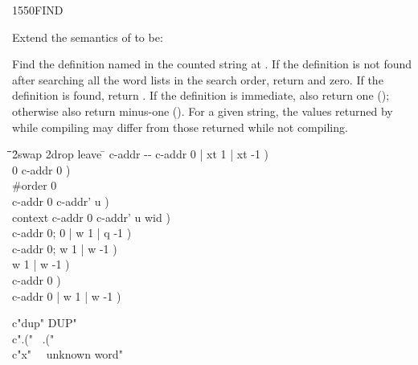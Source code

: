 \begin{worddef}{1550}{FIND}
\item Extend the semantics of  to be:


	Find the definition named in the counted string at .
	If the definition is not found after searching all the word lists
	in the search order, return  and zero. If
	the definition is found, return . If the definition is
	immediate, also return one (); otherwise also return
	minus-one (). For a given string, the values returned
	by  while compiling may differ from those returned
	while not compiling.


	\begin{implement} %

		\begin{tabbing}
		\tab \= \tab \= \tab \= \tab \= 2swap 2drop leave \tab \= \kill
		\word{:}   c-addr -{}- c-addr 0 | xt 1 | xt -1 ) \+ \\
			0 														\>\>\>\>	 c-addr 0 ) \\
			\#order  0  \+ \\
				 							\>\>\>	 c-addr 0 c-addr' u ) \\
				  context \word{+} 		\>\>\>	 c-addr 0 c-addr' u wid ) \\
												\>\>\>	 c-addr 0; 0 | w 1 | q -1 ) \\
				 								\>\>\>	\word{p} c-addr 0; w 1 | w -1 ) \+ \\
				\>	  			\>		 w 1 | w -1 )  \\
															\>\>	 c-addr 0 ) \- \\
															\>\>\>	 c-addr 0 | w 1 | w -1 ) \- \\
		\word{;}
		\end{tabbing}
	\end{implement}

	\begin{testing} %
		\ttfamily
		\word{:} c"dup"  DUP" \word{;} \\
		\word{:} c".("~  .("~ \word{;} \\
		\word{:} c"x"~~  unknown word" \word{;}

		 \\
		 \\
	\end{testing}
\end{worddef}


